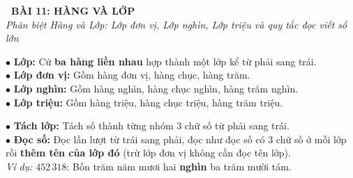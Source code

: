 \documentclass[14pt,a4paper,oneside]{extbook}
\begin{document}
\noindent
\begin{tcolorbox}[
  enhanced,
  colback=teal!8!white,
  colframe=teal!80!black,
  arc=3mm, boxrule=1pt,
  left=3mm, right=3mm, top=2mm, bottom=2mm,
  halign=center
]
  {\Large\bfseries\color{teal!90!black}\faBookmark\ BÀI 11: HÀNG VÀ LỚP}\\[1.5pt]
  {\footnotesize\itshape\color{black!75} Phân biệt Hàng và Lớp: Lớp đơn vị, Lớp nghìn, Lớp triệu và quy tắc đọc viết số lớn}
\end{tcolorbox}

\vspace{2.5mm}

\noindent
\begin{minipage}[t]{0.49\textwidth}
  \begin{tcolorbox}[
    enhanced,
    title={\footnotesize\bfseries\color{white}\faColumns\ 1. Khái niệm Hàng \& Lớp},
    colback=blue!2!white,
    colframe=blue!75!black,
    arc=2.5mm, boxrule=0.8pt, top=1.8mm, bottom=1.8mm, left=2mm, right=2mm
  ]
    \footnotesize
    $\bullet$ \textbf{Lớp:} Cứ \textbf{ba hàng liền nhau} hợp thành một lớp kể từ phải sang trái.\\
    $\bullet$ \textbf{Lớp đơn vị:} Gồm hàng đơn vị, hàng chục, hàng trăm.\\
    $\bullet$ \textbf{Lớp nghìn:} Gồm hàng nghìn, hàng chục nghìn, hàng trăm nghìn.\\
    $\bullet$ \textbf{Lớp triệu:} Gồm hàng triệu, hàng chục triệu, hàng trăm triệu.
  \end{tcolorbox}
\end{minipage}%
\hfill
\begin{minipage}[t]{0.49\textwidth}
  \begin{tcolorbox}[
    enhanced,
    title={\footnotesize\bfseries\color{white}\faBookOpen\ 2. Quy tắc đọc \& Viết số theo lớp},
    colback=teal!2!white,
    colframe=teal!75!black,
    arc=2.5mm, boxrule=0.8pt, top=1.8mm, bottom=1.8mm, left=2mm, right=2mm
  ]
    \footnotesize
    $\bullet$ \textbf{Tách lớp:} Tách số thành từng nhóm 3 chữ số từ phải sang trái.\\
    $\bullet$ \textbf{Đọc số:} Đọc lần lượt từ trái sang phải, đọc như đọc số có 3 chữ số ở mỗi lớp rồi \textbf{thêm tên của lớp đó} (trừ lớp đơn vị không cần đọc tên lớp).\\
    \textit{Ví dụ:} $452\,318$: Bốn trăm năm mươi hai \textbf{nghìn} ba trăm mười tám.
  \end{tcolorbox}
\end{minipage}
\end{document}
